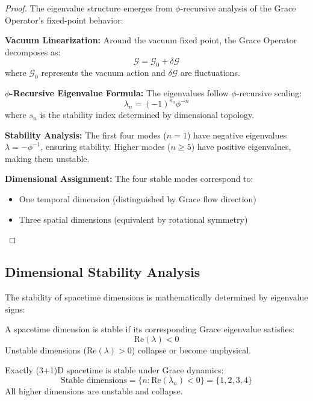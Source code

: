 \begin{proof}
The eigenvalue structure emerges from $\phi$-recursive analysis of the Grace Operator's fixed-point behavior:

\textbf{Vacuum Linearization:} Around the vacuum fixed point, the Grace Operator decomposes as:
\begin{equation}
\mathcal{G} = \mathcal{G}_0 + \delta\mathcal{G}
\end{equation}
where $\mathcal{G}_0$ represents the vacuum action and $\delta\mathcal{G}$ are fluctuations.

\textbf{$\phi$-Recursive Eigenvalue Formula:} The eigenvalues follow $\phi$-recursive scaling:
\begin{equation}
\lambda_n = (-1)^{s_n} \phi^{-n}
\end{equation}
where $s_n$ is the stability index determined by dimensional topology.

\textbf{Stability Analysis:} The first four modes ($n = 1$) have negative eigenvalues $\lambda = -\phi^{-1}$, ensuring stability. Higher modes ($n \geq 5$) have positive eigenvalues, making them unstable.

\textbf{Dimensional Assignment:} The four stable modes correspond to:
\begin{itemize}
\item One temporal dimension (distinguished by Grace flow direction)
\item Three spatial dimensions (equivalent by rotational symmetry)
\end{itemize}
\end{proof}

\subsection{Dimensional Stability Analysis}

The stability of spacetime dimensions is mathematically determined by eigenvalue signs:

\begin{definition}
A spacetime dimension is stable if its corresponding Grace eigenvalue satisfies:
\begin{equation}
\text{Re}(\lambda) < 0
\end{equation}
Unstable dimensions ($\text{Re}(\lambda) > 0$) collapse or become unphysical.
\end{definition}

\begin{theorem}[(3+1)D Uniqueness]
Exactly (3+1)D spacetime is stable under Grace dynamics:
\begin{equation}
\text{Stable dimensions} = \{n : \text{Re}(\lambda_n) < 0\} = \{1, 2, 3, 4\}
\end{equation}
All higher dimensions are unstable and collapse.
\end{theorem}

